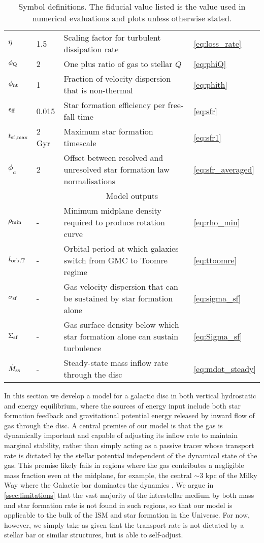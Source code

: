 \documentclass[useAMS,usenatbib]{mn2e}
\begin{document}
\begin{table*}
\begin{tabular}{llll}
$\eta$ & 1.5 & Scaling factor for turbulent dissipation rate & \ref{eq:loss_rate} \\
$\phi_{\rm Q}$ & 2 & One plus ratio of gas to stellar $Q$ & \ref{eq:phiQ} \\
$\phi_{\rm nt}$ & 1 & Fraction of velocity dispersion that is non-thermal & \ref{eq:phith} \\
$\epsilon_{\rm ff}$ & 0.015 & Star formation efficiency per free-fall time & \ref{eq:sfr} \\
$t_{\rm sf,max}$ & 2 Gyr & Maximum star formation timescale & \ref{eq:sfr1} \\
$\phi_a$ & 2 & Offset between resolved and unresolved star formation law normalisations  & \ref{eq:sfr_averaged} \\
\hline
\multicolumn{4}{c}{Model outputs} \\
\hline
$\rho_{\rm min}$ & - & Minimum midplane density required to produce rotation curve & \ref{eq:rho_min} \\
$t_{\rm orb,T}$ & - & Orbital period at which galaxies switch from GMC to Toomre regime & \ref{eq:ttoomre} \\
$\sigma_{\rm sf}$ & - & Gas velocity dispersion that can be sustained by star formation alone & \ref{eq:sigma_sf} \\
$\Sigma_{\rm sf}$ & - & Gas surface density below which star formation alone can sustain turbulence &
\ref{eq:Sigma_sf} \\
$\dot{M}_{\rm ss}$ & - & Steady-state mass inflow rate through the disc & \ref{eq:mdot_steady} \\
\hline
\end{tabular}
\caption{
\label{tab:quantities}
Symbol definitions. The fiducial value listed is the value used in numerical evaluations and plots unless otherwise stated.
}
\end{table*}

In this section we develop a model for a galactic disc in both vertical hydrostatic and energy equilibrium, where the sources of energy input include both star formation feedback and gravitational potential energy released by inward flow of gas through the disc. A central premise of our model is that the gas is dynamically important and capable of adjusting its inflow rate to maintain marginal stability, rather than simply acting as a passive tracer whose transport rate is dictated by the stellar potential independent of the dynamical state of the gas. This premise likely fails in regions where the gas contributes a negligible mass fraction even at the midplane, for example, the central $\sim 3$ kpc of the Milky Way where the Galactic bar dominates the dynamics \citep[e.g.,][]{binney91a}. We argue in \autoref{ssec:limitations} that the vast majority of the interstellar medium by both mass and star formation rate is not found in such regions, so that our model is applicable to the bulk of the ISM and star formation in the Universe. For now, however, we simply take as given that the transport rate is not dictated by a stellar bar or similar structures, but is able to self-adjust.
\end{document}
